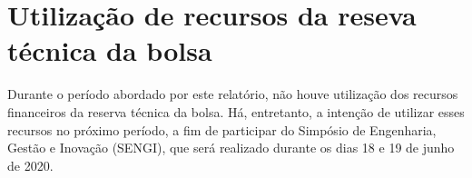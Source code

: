 \documentclass[a4paper,12pt]{article}
\begin{document}
\newpage

\section*{Utilização de recursos da reseva técnica da bolsa}

Durante o período abordado por este relatório, não houve utilização dos recursos financeiros da reserva técnica da bolsa. Há, entretanto, a intenção de utilizar esses recursos no próximo período, a fim de participar do Simpósio de Engenharia, Gestão e Inovação (SENGI), que será realizado durante os dias 18 e 19 de junho de 2020.

\newpage

\printbibliography
\end{document}
